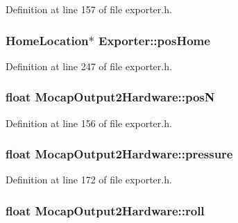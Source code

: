 \-Definition at line 157 of file exporter.\-h.

\hypertarget{group___mo_cap_plugin_ga9a7c0ada8bbd6bf8c95ca54f123befbe}{
\subsubsection[{pos\-Home}]{\setlength{\rightskip}{0pt plus 5cm}\-Home\-Location$\ast$ {\bf \-Exporter\-::pos\-Home}}}\label{group___mo_cap_plugin_ga9a7c0ada8bbd6bf8c95ca54f123befbe}


\-Definition at line 247 of file exporter.\-h.

\hypertarget{group___mo_cap_plugin_ga75792a6a49b67e8d7b63a219ca0f2ed2}{
\subsubsection[{pos\-N}]{\setlength{\rightskip}{0pt plus 5cm}float {\bf \-Mocap\-Output2\-Hardware\-::pos\-N}}}\label{group___mo_cap_plugin_ga75792a6a49b67e8d7b63a219ca0f2ed2}


\-Definition at line 156 of file exporter.\-h.

\hypertarget{group___mo_cap_plugin_ga521e946322d097a3b14b24f53ce1568f}{
\subsubsection[{pressure}]{\setlength{\rightskip}{0pt plus 5cm}float {\bf \-Mocap\-Output2\-Hardware\-::pressure}}}\label{group___mo_cap_plugin_ga521e946322d097a3b14b24f53ce1568f}


\-Definition at line 172 of file exporter.\-h.

\hypertarget{group___mo_cap_plugin_ga6db93cd0e529bbfcb33af3293ab16c62}{
\subsubsection[{roll}]{\setlength{\rightskip}{0pt plus 5cm}float {\bf \-Mocap\-Output2\-Hardware\-::roll}}}\label{group___mo_cap_plugin_ga6db93cd0e529bbfcb33af3293ab16c62}



